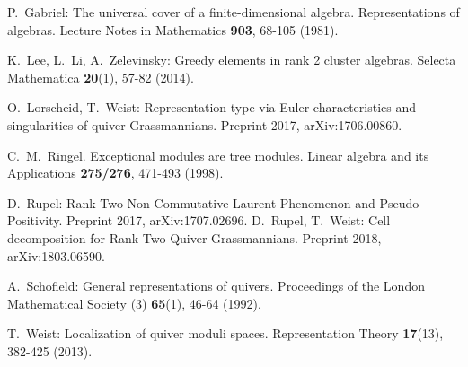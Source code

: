 \documentclass{amsart}
\numberwithin{equation}{section}
\begin{document}
\begin{thebibliography}{10}
  P.~Gabriel: The universal cover of a finite-dimensional algebra. Representations of algebras. Lecture Notes in Mathematics {\bf 903}, 68-105 (1981).

  K.~Lee, L.~Li, A.~Zelevinsky: Greedy elements in rank 2 cluster algebras. Selecta Mathematica \textbf{20}(1), 57-82 (2014).

  O.~Lorscheid, T.~Weist: Representation type via Euler characteristics and singularities of quiver Grassmannians. Preprint 2017, arXiv:1706.00860.

  C.~M.~Ringel. Exceptional modules are tree modules. Linear algebra and its Applications \textbf{275/276}, 471-493 (1998).

  D.~Rupel: Rank Two Non-Commutative Laurent Phenomenon and Pseudo-Positivity. Preprint 2017, arXiv:1707.02696.
D.~Rupel, T.~Weist: Cell decomposition for Rank Two Quiver Grassmannians. Preprint 2018, arXiv:1803.06590.

  A.~Schofield: General representations of quivers. Proceedings of the London Mathematical Society (3) \textbf{65}(1), 46-64 (1992).

  T.~Weist: Localization of quiver moduli spaces. Representation Theory \textbf{17}(13), 382-425 (2013).

\end{thebibliography}
\end{document}
